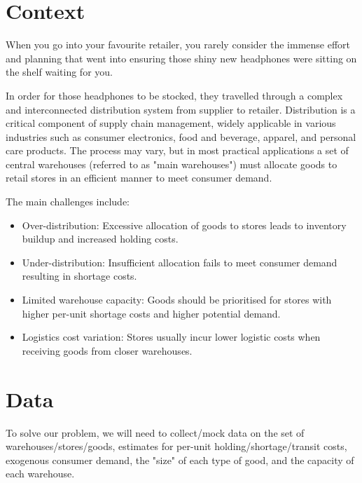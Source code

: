 \documentclass[a4paper,12pt]{article}
\begin{document}
%
%

\section{Context}
When you go into your favourite retailer, you rarely consider the immense effort and planning that went into ensuring those shiny new headphones were sitting on the shelf waiting for you.

In order for those headphones to be stocked, they travelled through a complex and interconnected distribution system from supplier to retailer. Distribution is a critical component of supply chain management, widely applicable in various industries such as consumer electronics, food and beverage, apparel, and personal care products. The process may vary, but in most practical applications a set of central warehouses (referred to as "main warehouses") must allocate goods to retail stores in an efficient manner to meet consumer demand.

The main challenges include:
\begin{itemize}
    \item Over-distribution: Excessive allocation of goods to stores leads to inventory buildup and increased holding costs.
    \item Under-distribution: Insufficient allocation fails to meet consumer demand resulting in shortage costs.
    \item Limited warehouse capacity: Goods should be prioritised for stores with higher per-unit shortage costs and higher potential demand.
    \item Logistics cost variation: Stores usually incur lower logistic costs when receiving goods from closer warehouses.
\end{itemize}
\section{Data}
To solve our problem, we will need to collect/mock data on the set of warehouses/stores/goods, estimates for per-unit holding/shortage/transit costs, exogenous consumer demand, the "size" of each type of good, and the capacity of each warehouse.
\end{document}
